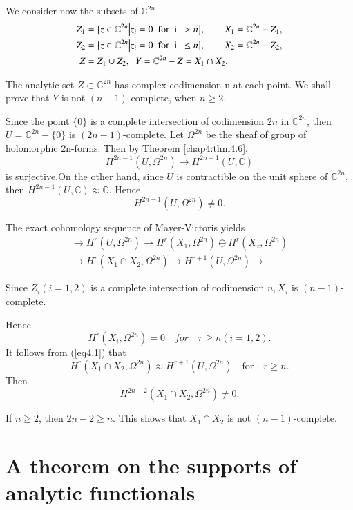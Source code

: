 We consider now the subsets of $\mathbb{C}^{2n}$
\begin{align*}
  Z_1 &= \big\{z \in {\mathbb{C}}^{2n} \big|  z_i=0 ~ \text{ for\; i }~ > n
  \big\},\qquad X_1= {\mathbb{C}}^{2n}-Z_1,\\ 
  Z_2 &= \big\{z \in {\mathbb{C}}^{2n} \big|  z_i=0 ~ \text{ for\; i }~ \leq
  n \big\},\qquad X_2={\mathbb{C}}^{2n}-Z_2,\\ 
  Z &= Z_1 \cup Z_2,~\;{Y}=\mathbb{C}^{2n}-Z={X}_1 \cap {X}_2.
\end{align*}

The analytic set $Z \subset {\mathbb{C}}^{2n}$ has complex codimension n at
each  point. We shall prove that $Y$ is not $(n-1)$-complete, when $n
\geq 2$.

Since the point $\{0\}$ is a complete intersection of codimension $2n$ in
$\mathbb{C}^{2n}$, then $U= {\mathbb{C}}^{2n}-\{0\}$ is $(2n-1)$-complete.  
Let $\Omega^{2n}$ be the sheaf of group of holomorphic 2n-forms. Then by
Theorem \ref{chap4:thm4.6}. 
$$ 
H^{2n-1}(U,\Omega^{2n}) \rightarrow H^{2n-1} (U,\mathbb{C})
$$
is surjective.\pageoriginale On the other hand, since $U$ is
contractible on the unit sphere of $\mathbb{C}^{2n}$, then $H^{2n-1}
(U, \mathbb{C}) \approx \mathbb{C}$. Hence    
$$
H^{2n-1} (U,\Omega^{2n})  \neq 0.
$$

The exact cohomology sequence of Mayer-Victoris yields 
\begin{multline*}
   \rightarrow H^r(U,\Omega^{2n}) \rightarrow H^r(X_1,\Omega^{2n})
  \oplus H^r(X_z, \Omega^{2n})\\
 \rightarrow H^r (X{_1 \cap} X_2
  ,\Omega^{2n})\rightarrow H^{r+1} (U, \Omega^{2n}) \rightarrow
 \tag{4.1}\label{eq4.1}
\end{multline*}

Since $Z_i(i=1,2)$ is a complete intersection of codimension $n,X_i$
is $(n-1)$-complete. 

Hence
$$
   H^r(X_i , \Omega^{2n}) = 0 \quad for \quad r \geq n (i=1,2).
$$
It follows from (\ref{eq4.1})  that
$$ 
H^r(X_1 \cap X_2 , \Omega^{2n}) \approx H^{r+1}
    (U,\Omega^{2n}) \quad \text{for} \quad r \geq n. 
$$
Then
$$
H^{2n-2} (X_1 \cap X_2, \Omega^{2n}) \neq 0.
$$
 
If $n\geq 2$, then $2n-2\geq n$. This shows that $X_1 \cap X_2$ is
not $(n-1)$-complete. 

\section{A theorem on the supports of analytic functionals}%

